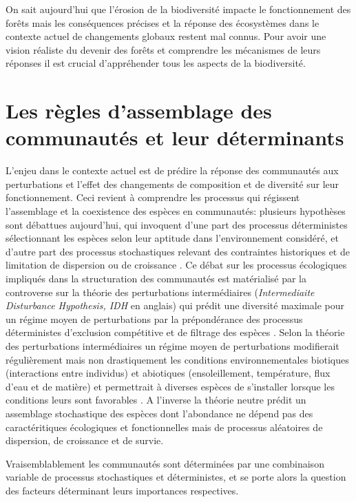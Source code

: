 \documentclass[
  11pt,
  french,
  A4paper,
  extrafontsizes,onecolumn,openright
  ]{memoir}
\begin{document}
On sait aujourd'hui que l'érosion de la biodiversité impacte le
fonctionnement des forêts mais les conséquences précises et la réponse
des écosystèmes dans le contexte actuel de changements globaux restent
mal connus. Pour avoir une vision réaliste du devenir des forêts et
comprendre les mécanismes de leurs réponses il est crucial d'appréhender
tous les aspects de la biodiversité.

\section{Les règles d'assemblage des communautés et leur
déterminants}\label{les-regles-dassemblage-des-communautes-et-leur-determinants}

L'enjeu dans le contexte actuel est de prédire la réponse des
communautés aux perturbations et l'effet des changements de composition
et de diversité sur leur fonctionnement. Ceci revient à comprendre les
processus qui régissent l'assemblage et la coexistence des espèces en
communautés: plusieurs hypothèses sont débattues aujourd'hui, qui
invoquent d'une part des processus déterministes sélectionnant les
espèces selon leur aptitude dans l'environnement considéré, et d'autre
part des processus stochastiques relevant des contraintes historiques et
de limitation de dispersion ou de croissance \autocite{Hubbell1999}. Ce
débat sur les processus écologiques impliqués dans la structuration des
communautés est matérialisé par la controverse sur la théorie des
perturbations intermédiaires (\emph{Intermediaite Disturbance
Hypothesis, IDH} en anglais) qui prédit une diversité maximale pour un
régime moyen de perturbations par la prépondérance des processus
déterministes d'exclusion compétitive et de filtrage des espèces
\autocite{Molino2001}. Selon la théorie des perturbations intermédiaires
un régime moyen de perturbations modifierait régulièrement mais non
drastiquement les conditions environnementales biotiques (interactions
entre individus) et abiotiques (ensoleillement, température, flux d'eau
et de matière) et permettrait à diverses espèces de s'installer lorsque
les conditions leurs sont favorables
\autocites{Kariuki2006a}{Berry2008a}. A l'inverse la théorie neutre
prédit un assemblage stochastique des espèces dont l'abondance ne dépend
pas des caractéritiques écologiques et fonctionnelles mais de processus
aléatoires de dispersion, de croissance et de survie.

Vraisemblablement les communautés sont déterminées par une combinaison
variable de processus stochastiques et déterministes, et se porte alors
la question des facteurs déterminant leurs importances respectives.
\end{document}
